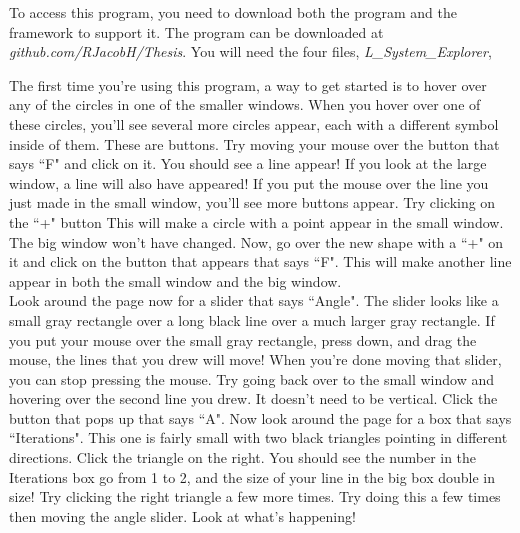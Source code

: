 \documentclass[12pt,twoside]{reedthesis}
\begin{document}
	To access this program, you need to download both the program and the framework to support it. The program can be downloaded at \textit{github.com/RJacobH/Thesis}. You will need the four files, \textit{L_System_Explorer}, 
	
	
	The first time you're using this program, a way to get started is to hover over any of the circles in one of the smaller windows. When you hover over one of these circles, you'll see several more circles appear, each with a different symbol inside of them. These are buttons. Try moving your mouse over the button that says ``F" and click on it. You should see a line appear! If you look at the large window, a line will also have appeared! If you put the mouse over the line you just made in the small window, you'll see more buttons appear. Try clicking on the ``+" button This will make a circle with a point appear in the small window. The big window won't have changed. Now, go over the new shape with a ``+" on it and click on the button that appears that says ``F". This will make another line appear in both the small window and the big window.\\
	
	Look around the page now for a slider that says ``Angle". The slider looks like a small gray rectangle over a long black line over a much larger gray rectangle. If you put your mouse over the small gray rectangle, press down, and drag the mouse, the lines that you drew will move! When you're done moving that slider, you can stop pressing the mouse. Try going back over to the small window and hovering over the second line you drew. It doesn't need to be vertical. Click the button that pops up that says ``A". Now look around the page for a box that says ``Iterations". This one is fairly small with two black triangles pointing in different directions. Click the triangle on the right. You should see the number in the Iterations box go from 1 to 2, and the size of your line in the big box double in size! Try clicking the right triangle a few more times. Try doing this a few times then moving the angle slider. Look at what's happening!\\
	
\end{document}
